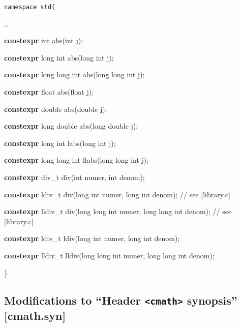 \documentclass[prd,preprint,amsmath,amssymb,nofootinbib,eqsecnum]{revtex4-1}
\newcommand{\code}[1]{{\tt #1}}
\newcommand{\header}[1]{{\tt <#1>}}
\newcommand{\highlight}[1]{{\bf #1}}
\begin{document}
\code{namespace std\{

\ldots

\highlight{constexpr} int abs(int j);

\highlight{constexpr}  long int abs(long int j);

\highlight{constexpr}  long long int abs(long long int j);

\highlight{constexpr}  float abs(float j);

\highlight{constexpr} double abs(double j);

\highlight{constexpr} long double abs(long double j);

\vspace{2ex}

\highlight{constexpr} long int labs(long int j);

\highlight{constexpr}  long long int llabs(long long int j);

\vspace{2ex}

\highlight{constexpr} div\_t div(int numer, int denom);

\highlight{constexpr} ldiv\_t div(long int numer, long int denom); // see [library.c]

\highlight{constexpr} lldiv\_t div(long long int numer, long long int denom); // see [library.c]

\highlight{constexpr} ldiv\_t ldiv(long int numer, long int denom);

\highlight{constexpr} lldiv\_t lldiv(long long int numer, long long int denom);	

\}}

\subsection{Modifications to  ``Header \header{cmath} synopsis'' [cmath.syn]}
\end{document}
